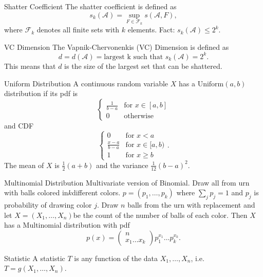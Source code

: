 \documentclass[avery5371,grid]{flashcards}
\begin{document}
\begin{flashcard}[Definition]{Shatter Coefficient}
 The shatter coefficient is defined as
 \[
 s_k(\mathcal{A}) = \sup_{F\in \mathcal{F}_k} s(\mathcal{A},F),
 \]
where $\mathcal{F}_k$ denotes all finite sets with $k$ elements. 
Fact: $s_k(\mathcal{A}) \le 2^k$. 
\end{flashcard}



\begin{flashcard}[Definition]{VC Dimension}
 The Vapnik-Chervonenkis (VC) Dimension is defined as
 \[
 d = d(\mathcal{A}) = \text{largest k such that } s_k(\mathcal{A}) = 2^k.
 \]
This means that $d$ is the size of the largest set that can be shattered.
\end{flashcard}


\begin{flashcard}[Definition]{Uniform Distribution}
\scriptsize
A continuous random variable $X$ has a $\text{Uniform}(a,b)$ distribution if its pdf is 
\[\begin{cases} \frac{1}{b - a} & \text{for } x \in [a,b] \\ 0 & \text{otherwise} \end{cases}\]
and CDF
\[\begin{cases} 0 & \text{for } x < a \\ \frac{x-a}{b-a} & \text{for } x \in [a,b) \\ 1 & \text{for } x \ge b \end{cases}.\]
The mean of $X$ is $\frac{1}{2}(a+b)$ and the variance $\tfrac{1}{12}(b-a)^2$.

\end{flashcard}

\begin{flashcard}[Definition]{Multinomial Distribution}
Multivariate version of Binomial. Draw all from urn with balls colored
in$k$different colors. $p=\left(p_{1},\ldots,p_{k}\right)$ where
$\sum_{j}p_{j}=1$ and $p_{j}$ is probability of drawing color $j$.
Draw $n$ balls from the urn with replacement and let $X=\left(X_{1},\ldots,X_{n}\right)$be
the count of the number of balls of each color. Then $X$ has a Multinomial
distribution with pdf 
\[
p\left(x\right)=\left(\begin{array}{c}
n\\
x_{1}\ldots x_{k}
\end{array}\right)p_{1}^{x_{1}}\ldots p_{k}^{x_{k}}.
\]
\end{flashcard}

\begin{flashcard}[Definition]{Statistic}
A statistic $T$ is any function of the data $X_1, \ldots, X_n$, i.e. $T=g(X_1,\ldots,X_n)$.
\end{flashcard}
\end{document}
